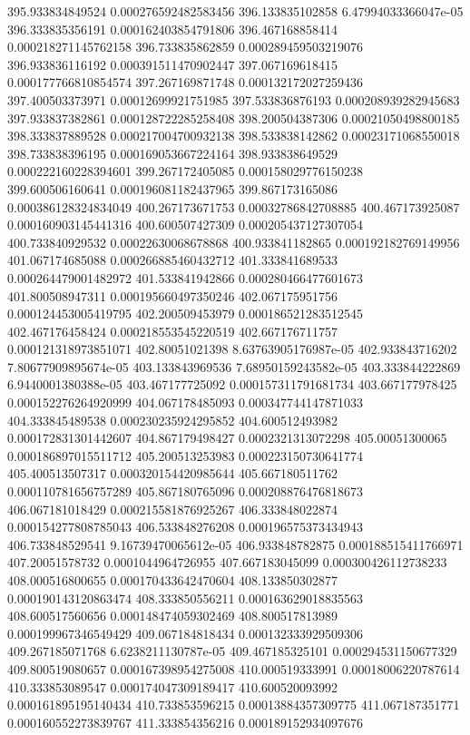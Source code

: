 {395.933834849524 0.000276592482583456
396.133835102858 6.47994033366047e-05
396.333835356191 0.000162403854791806
396.467168858414 0.000218271145762158
396.733835862859 0.000289459503219076
396.933836116192 0.000391511470902447
397.067169618415 0.000177766810854574
397.267169871748 0.000132172027259436
397.400503373971 0.00012699921751985
397.533836876193 0.000208939282945683
397.933837382861 0.000128722285258408
398.200504387306 0.00021050498800185
398.333837889528 0.000217004700932138
398.533838142862 0.00023171068550018
398.733838396195 0.000169053667224164
398.933838649529 0.000222160228394601
399.267172405085 0.000158029776150238
399.600506160641 0.000196081182437965
399.867173165086 0.000386128324834049
400.267173671753 0.00032786842708885
400.467173925087 0.000160903145441316
400.600507427309 0.000205437127307054
400.733840929532 0.00022630068678868
400.933841182865 0.000192182769149956
401.067174685088 0.000266885460432712
401.333841689533 0.000264479001482972
401.533841942866 0.000280466477601673
401.800508947311 0.000195660497350246
402.067175951756 0.000124453005419795
402.200509453979 0.000186521283512545
402.467176458424 0.000218553545220519
402.667176711757 0.000121318973851071
402.80051021398 8.63763905176987e-05
402.933843716202 7.80677909895674e-05
403.133843969536 7.68950159243582e-05
403.333844222869 6.9440001380388e-05
403.467177725092 0.000157311791681734
403.667177978425 0.000152276264920999
404.067178485093 0.000347744147871033
404.333845489538 0.000230235924295852
404.600512493982 0.000172831301442607
404.867179498427 0.0002321313072298
405.00051300065 0.000186897015511712
405.200513253983 0.000223150730641774
405.400513507317 0.000320154420985644
405.667180511762 0.000110781656757289
405.867180765096 0.000208876476818673
406.067181018429 0.000215581876925267
406.333848022874 0.000154277808785043
406.533848276208 0.000196575373434943
406.733848529541 9.16739470065612e-05
406.933848782875 0.000188515411766971
407.20051578732 0.0001044964726955
407.667183045099 0.000300426112738233
408.000516800655 0.000170433642470604
408.133850302877 0.000190143120863474
408.333850556211 0.000163629018835563
408.600517560656 0.000148474059302469
408.800517813989 0.000199967346549429
409.067184818434 0.000132333929509306
409.267185071768 6.6238211130787e-05
409.467185325101 0.000294531150677329
409.800519080657 0.000167398954275008
410.000519333991 0.00018006220787614
410.333853089547 0.000174047309189417
410.600520093992 0.000161895195140434
410.733853596215 0.00013884357309775
411.067187351771 0.000160552273839767
411.333854356216 0.000189152934097676
}

